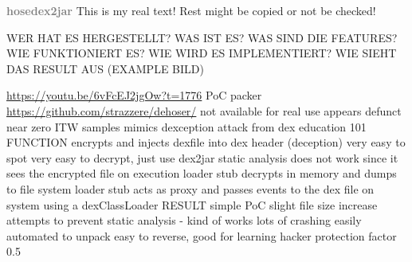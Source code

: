 \newline\newline\textbf{\textcolor{gray}{hosedex2jar}}\newline
This is my real text! Rest might be copied or not be checked!



WER HAT ES HERGESTELLT? WAS IST ES? WAS SIND DIE FEATURES? WIE FUNKTIONIERT ES? WIE WIRD ES IMPLEMENTIERT? WIE SIEHT DAS RESULT AUS (EXAMPLE BILD)\newline

\url{https://youtu.be/6vFcEJ2jgOw?t=1776}\newline
PoC packer\newline
\url{https://github.com/strazzere/dehoser/}\newline
not available for real use\newline
appears defunct\newline
near zero ITW samples\newline
mimics dexception attack from dex education 101\newline
FUNCTION\newline
encrypts and injects dexfile into dex header (deception)\newline
very easy to spot\newline
very easy to decrypt, just use dex2jar\newline
static analysis does not work since it sees the encrypted file\newline
on execution loader stub decrypts in memory and dumps to file system\newline
loader stub acts as proxy and passes events to the dex file on system using a dexClassLoader\newline
RESULT\newline
simple PoC\newline
slight file size increase\newline
attempts to prevent static analysis - kind of works\newline
lots of crashing\newline
easily automated to unpack\newline
easy to reverse, good for learning\newline
hacker protection factor 0.5
